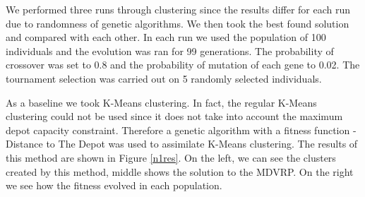 \documentclass[conference]{IEEEtran}
\begin{document}
We performed three runs through clustering since the results differ for each run due to randomness of genetic algorithms. We then took the best found solution and compared with each other. In each run we used the population of 100 individuals and the evolution was ran for 99 generations. The probability of crossover was set to 0.8 and the probability of mutation of each gene to 0.02. The tournament selection was carried out on 5 randomly selected individuals.

As a baseline we took K-Means clustering. In fact, the regular K-Means clustering could not be used since it does not take into account the maximum depot capacity constraint. Therefore a genetic algorithm with a fitness function - Distance to The Depot was used to assimilate K-Means clustering. The results of this method are shown in Figure \ref{n1res}. On the left, we can see the clusters created by this method, middle shows the solution to the MDVRP. On the right we see how the fitness evolved in each population.
\end{document}
